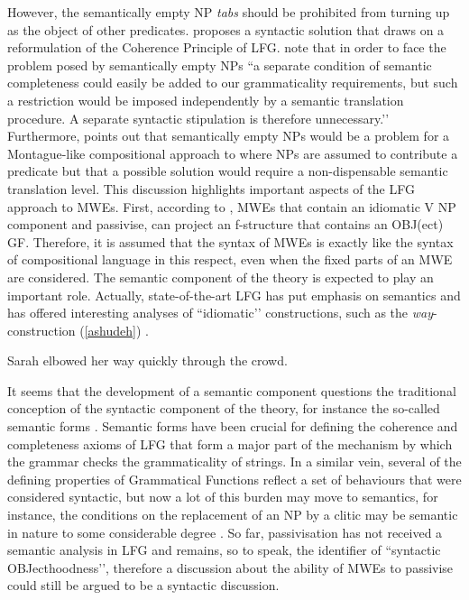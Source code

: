 \documentclass[output=paper]{langsci/langscibook}
\begin{document}
However, the semantically empty NP \textit{tabs} should be prohibited from turning up as the object of other predicates. \citet{Andrews:82} proposes a syntactic solution that draws on a reformulation of the Coherence Principle of LFG. \citet[67]{kaplan1995} note that in order to face the problem posed by semantically empty NPs ``a separate condition of semantic completeness could easily be added to our grammaticality requirements, but such a restriction would be imposed independently by a semantic translation procedure. A separate syntactic stipulation is therefore unnecessary.’' Furthermore, \citet[158]{Partee:04} points out that semantically empty NPs would be a problem for a  Montague-like compositional approach to  where NPs are assumed to contribute a predicate but that a possible solution would require a non-dispensable semantic translation level.
This discussion highlights important aspects of the LFG approach to MWEs. First, according to \citet{Bresnan:82}, MWEs that contain an idiomatic V NP component and passivise, can project an f-structure that contains an OBJ(ect) GF.  Therefore, it is assumed that the syntax of MWEs is exactly like the syntax of compositional language in this respect, even when the fixed parts of an MWE are considered. The semantic component of the theory is expected to play an important role. Actually, state-of-the-art LFG has put emphasis on semantics and has offered interesting analyses of ``idiomatic'’ constructions, such as the \textit{way}-construction (\ref{ashudeh}) \citep[30]{Asudeh:al:08}.  

\ea \label{ashudeh}
Sarah elbowed her way quickly through the crowd.
\z

It seems that the development of a semantic component questions the traditional conception of the syntactic component of the theory, for instance the so-called semantic forms  \citep{Lowe:2015}. Semantic forms have been crucial for defining the coherence and completeness axioms of LFG that form a major part of the mechanism by which the grammar checks the grammaticality of strings.  In a similar vein, several of the defining properties of Grammatical Functions  reflect a set of behaviours that were considered syntactic, but now a lot of this burden may move to semantics, for instance,  the conditions on the replacement of an NP by a clitic may be semantic in nature  to some considerable degree \citep{Arnold:15}.  So far, passivisation has not received a semantic analysis in LFG and remains, so to speak, the identifier of ``syntactic OBJecthoodness'’, therefore a discussion about the ability of MWEs to passivise could still be argued to be a syntactic discussion.
\end{document}
